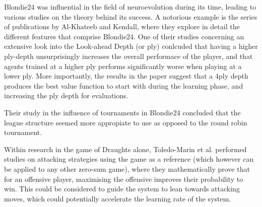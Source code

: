 \documentclass[12pt,a4paper]{article}
\begin{document}
        Blondie24 was influential in the field of neuroevolution during its time, leading to various studies on the theory behind its success. A notorious example is the series of publications by Al-Khateeb and Kendall, where they explore in detail the different features that comprise Blondie24. One of their studies concerning an extensive look into the Look-ahead Depth (or ply) conlcuded that having a higher ply-depth unsurprisingly increases the overall performace of the player, and that agents trained at a higher ply performs significantly worse when playing at a lower ply. More importantly, the results in the paper suggest that a 4ply depth produces the best value function to start with during the learning phase, and increasing the ply depth for evaluations. \cite{al-khateeb_effect_2012} 
        
        Their study in the influence of tournaments in Blondie24 concluded that the league structure seemed more appropiate to use as opposed to the round robin tournament. \cite{al-khateeb_introducing_2009}
        
        Within research in the game of Draughts alone, Toledo-Marin et al.  performed studies on attacking strategies using the game as a reference (which however can be applied to any other zero-sum game), where they mathematically prove that for an offensive player, maximising the offensive improves their probability to win.\cite{toledo-marin_is_2016} This could be considered to guide the system to lean towards attacking moves, which could potentially accelerate the learning rate of the system.

        
\end{document}
